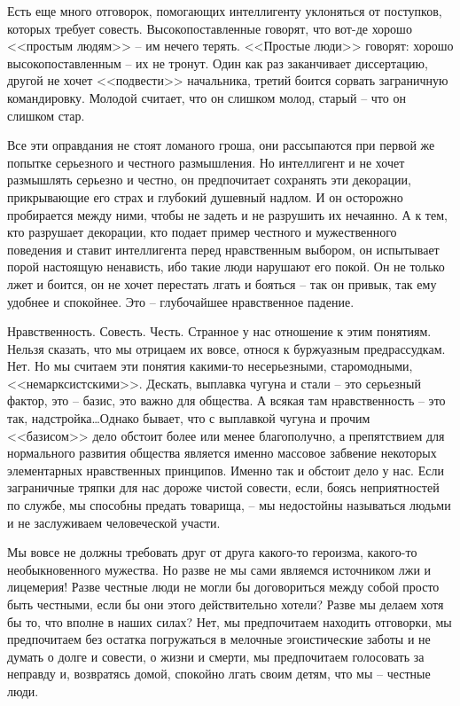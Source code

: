 \documentclass{book}
\begin{document}
Есть еще много отговорок, помогающих интеллигенту уклоняться от поступков, которых требует совесть. Высокопоставленные говорят, что вот-де хорошо <<простым людям>> -- им нечего терять. <<Простые люди>> говорят: хорошо высокопоставленным -- их не тронут. Один как раз заканчивает диссер­тацию, другой не хочет <<подвести>> начальника, третий боится сорвать заграничную командировку. Молодой считает, что он слишком молод, старый -- что он слишком стар.

Все эти оправдания не стоят ломаного гроша, они рассыпа­ются при первой же попытке серьезного и честного размышле­ния. Но интеллигент и не хочет размышлять серьезно и честно, он предпочитает сохранять эти декорации, прикрывающие его страх и глубокий душевный надлом. И он осторожно пробирается между ними, чтобы не задеть и не разрушить их нечаянно. А к тем, кто разрушает декорации, кто подает пример честного и мужественного поведения и ставит интеллигента перед нравственным выбором, он испытывает порой настоящую ненависть, ибо такие люди нарушают его покой. Он не только лжет и боится, он не хочет перестать лгать и бояться -- так он привык, так ему удобнее и спокойнее. Это -- глубочайшее нравственное падение.

Нравственность. Совесть. Честь. Странное у нас отношение к этим понятиям. Нельзя сказать, что мы отрицаем их вовсе, относя к буржуазным предрассудкам. Нет. Но мы считаем эти понятия какими-то несерьезными, старомодными, <<немарксистскими>>. Дескать, выплавка чугуна и стали -- это серьезный фактор, это -- базис,  это важно для общества. А всякая там нравственность -- это так, надстройка\ldots  Однако бывает, что с выплавкой чугуна и прочим <<базисом>> дело обстоит более или менее благополучно, а препятствием для нормального развития общества является именно массовое забвение некоторых элементарных нравственных принципов.
Именно так и обстоит дело у нас. Если заграничные тряп­ки для нас дороже чистой совести, если, боясь неприятностей по службе, мы способны предать товарища, -- мы недостойны называться людьми и не заслуживаем человеческой участи.

Мы вовсе не должны требовать друг от друга какого-то героизма, какого-то необыкновенного мужества. Но разве не мы сами являемся источником лжи и лицемерия! Разве честные люди не могли бы договориться между собой просто быть честными, если бы они этого действительно хотели? Разве мы делаем хотя бы то, что вполне в наших силах? Нет, мы предпочитаем находить отговорки, мы предпочитаем без остатка погружаться в мелочные эгоистические заботы и не думать о долге и совести, о жизни и смерти, мы предпочитаем голосовать за неправду и, возвратясь домой, спокойно лгать своим детям, что мы -- честные люди.
\end{document}
